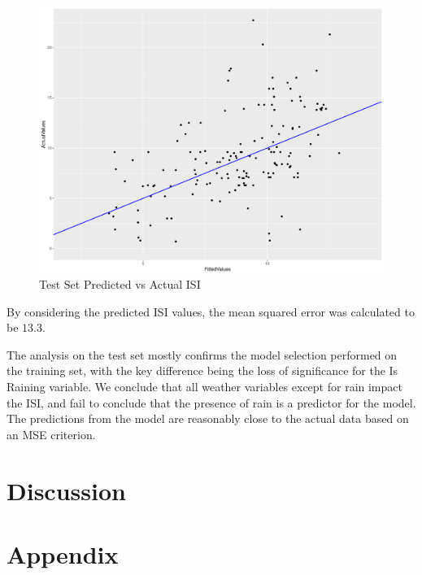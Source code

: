 \documentclass{article}
\begin{document}
\begin{figure}
\centering
\includegraphics[width=\textwidth]{TestSetFittedVsActual.pdf}
\caption{Test Set Predicted vs Actual ISI}
\label{TestSetPredictedVsActual}
\end{figure}
By considering the predicted ISI values, the mean squared error was calculated to be $13.3$. 


The analysis on the test set mostly confirms the model selection performed on the training set, with the key difference being the loss of significance for the Is Raining variable.  We conclude that all weather variables except for rain impact the ISI, and fail to conclude that the presence of rain is a predictor for the model. The predictions from the model are reasonably close to the actual data based on an MSE criterion. 




\section{Discussion}\label{Discussion}

\section{Appendix}
\end{document}
